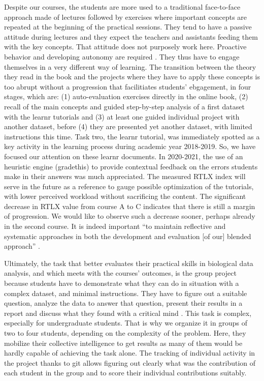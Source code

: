 \documentclass{aims}
\theoremstyle{definition}
\begin{document}
Despite our courses, the students are more used to a traditional
face-to-face approach made of lectures followed by exercises where
important concepts are repeated at the beginning of the practical
sessions. They tend to have a passive attitude during lectures and they
expect the teachers and assistants feeding them with the key concepts.
That attitude does not purposely work here. Proactive behavior and
developing autonomy are required \cite{Freeman2014}. They thus have to
engage themselves in a very different way of learning. The transition
between the theory they read in the book and the projects where they
have to apply these concepts is too abrupt without a progression that
facilitiates students' ebgagement, in four stages, which are: (1)
auto-evaluation exercises directly in the online book, (2) recall of the
main concepts and guided step-by-step analysis of a first dataset with
the learnr tutorials and (3) at least one guided individual project with
another dataset, before (4) they are presented yet another dataset, with
limited instructions this time. Task two, the learnr tutorial, was
immediately spotted as a key activity in the learning process during
academic year 2018-2019. So, we have focused our attention on these
learnr documents. In 2020-2021, the use of an heuristic engine
(gradethis) to provide contextual feedback on the errors students make
in their answers was much appreciated. The measured RTLX index will
serve in the future as a reference to gauge possible optimization of the
tutorials, with lower perceived workload without sacrificing the
content. The significant decrease in RTLX value from course A to C
indicates that there is still a margin of progression. We would like to
observe such a decrease sooner, perhaps already in the second course. It
is indeed important ``to maintain reflective and systematic approaches
in both the development and evaluation {[}of our{]} blended approach''
\cite{Spadafora2018}.

Ultimately, the task that better evaluates their practical skills in
biological data analysis, and which meets with the courses' outcomes, is
the group project because students have to demonstrate what they can do
in situation with a complex dataset, and minimal instructions. They have
to figure out a suitable question, analyze the data to answer that
question, present their results in a report and discuss what they found
with a critical mind \cite{Auker2020}. This task is complex, especially
for undergraduate students. That is why we organize it in groups of two
to four students, depending on the complexity of the problem. Here, they
mobilize their collective intelligence to get results as many of them
would be hardly capable of achieving the task alone. The tracking of
individual activity in the project thanks to git allows figuring out
clearly what was the contribution of each student in the group and to
score their individual contributions suitably.
\end{document}
